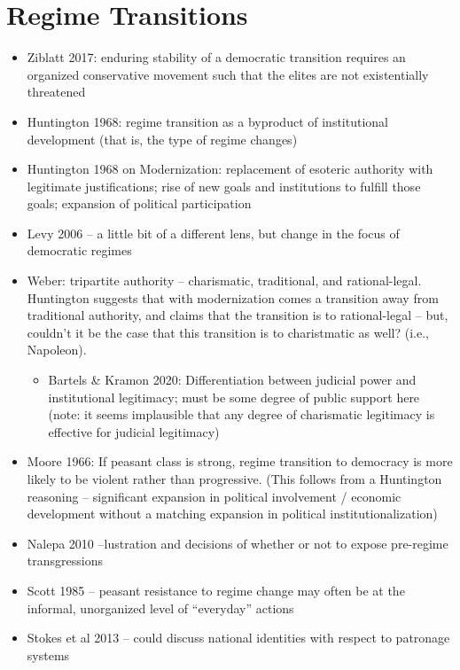 \documentclass[12pt]{article}
\begin{document}
\section*{Regime Transitions}

\begin{itemize}
    \item Ziblatt 2017: enduring stability of a democratic transition requires an organized conservative movement such that the elites are not existentially threatened
    \item Huntington 1968: regime transition as a byproduct of institutional development (that is, the type of regime changes)
    \item Huntington 1968 on Modernization: replacement of esoteric authority with legitimate justifications; rise of new goals and institutions to fulfill those goals; expansion of political participation
    \item Levy 2006 -- a little bit of a different lens, but change in the focus of democratic regimes
    \item Weber: tripartite authority -- charismatic, traditional, and rational-legal. Huntington suggests that with modernization comes a transition away from traditional authority, and claims that the transition is to rational-legal -- but, couldn't it be the case that this transition is to charistmatic as well? (i.e., Napoleon).
    \begin{itemize}
        \item Bartels \& Kramon 2020: Differentiation between judicial power and institutional legitimacy; must be some degree of public support here (note: it seems implausible that any degree of charismatic legitimacy is effective for judicial legitimacy)
    \end{itemize}
    \item Moore 1966: If peasant class is strong, regime transition to democracy is more likely to be violent rather than progressive. (This follows from a Huntington reasoning -- significant expansion in political involvement / economic development without a matching expansion in political institutionalization)
    \item Nalepa 2010 --lustration and decisions of whether or not to expose pre-regime transgressions
    \item Scott 1985 -- peasant resistance to regime change may often be at the informal, unorganized level of ``everyday'' actions
    \item Stokes et al 2013 -- could discuss national identities with respect to patronage systems

\end{itemize}
\end{document}
